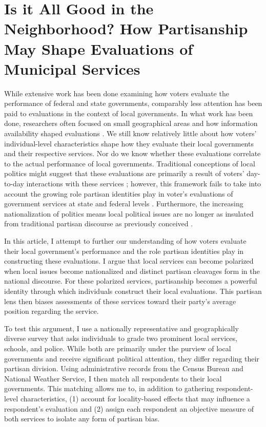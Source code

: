 \chapter{Is it All Good in the Neighborhood? How Partisanship May Shape Evaluations of Municipal Services}
\label{chap:chapter2}

While extensive work has been done examining how voters evaluate the performance of federal and state governments, comparably less attention has been paid to evaluations in the context of local governments. In what work has been done, researchers often focused on small geographical areas and how information availability shaped evaluations \citep[e.g.,][]{berryAccountabilityLocalElections2007,paysonWhenAreLocal2017}. We still know relatively little about how voters' individual-level characteristics shape how they evaluate their local governments and their respective services. Nor do we know whether these evaluations correlate to the actual performance of local governments. Traditional conceptions of local politics might suggest that these evaluations are primarily a result of voters' day-to-day interactions with these services \citep[e.g.,][]{kaufmannUrbanVoterGroup2004,yoderDoesPropertyOwnership2020}; however, this framework fails to take into account the growing role partisan identities play in voter's evaluations of government services at state and federal levels \citep{healyRetrospectiveVotingReconsidered2013}. Furthermore, the increasing nationalization of politics means local political issues are no longer as insulated from traditional partisan discourse as previously conceived \citep{hopkinsIncreasinglyUnitedStates2018}.

In this article, I attempt to further our understanding of how voters evaluate their local government's performance and the role partisan identities play in constructing these evaluations. I argue that local services can become polarized when local issues become nationalized and distinct partisan cleavages form in the national discourse. For these polarized services, partisanship becomes a powerful identity through which individuals construct their local evaluations. This partisan lens then biases assessments of these services toward their party's average position regarding the service.

To test this argument, I use a nationally representative and geographically diverse survey that asks individuals to grade two prominent local services, schools, and police. While both are primarily under the purview of local governments and receive significant political attention, they differ regarding their partisan division. Using administrative records from the Census Bureau and National Weather Service, I then match all respondents to their local governments. This matching allows me to, in addition to gathering respondent-level characteristics,  (1) account for locality-based effects that may influence a respondent's evaluation and (2) assign each respondent an objective measure of both services to isolate any form of partisan bias. 


